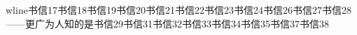 wline{}书信17\newline{}书信18\newline{}书信19\newline{}书信20\newline{}书信21\newline{}书信22\newline{}书信23\newline{}书信24\newline{}书信26\newline{}书信27\newline{}书信28——更广为人知的是\newline{}书信29\newline{}书信31\newline{}书信32\newline{}书信33\newline{}书信34\newline{}书信35\newline{}书信37\newline{}书信38\newline{}